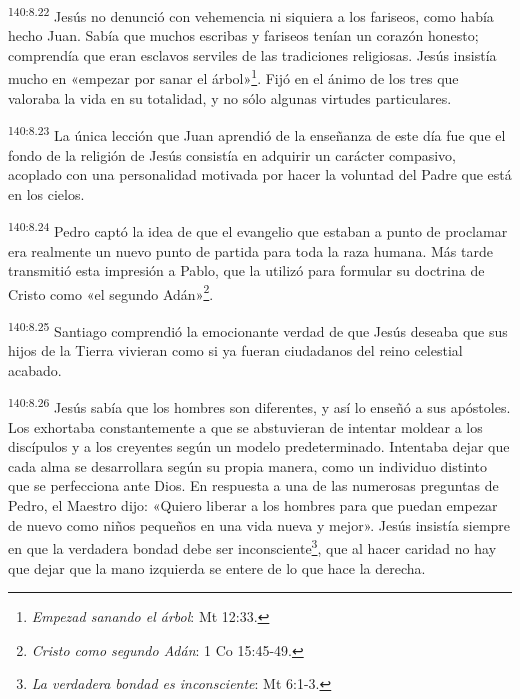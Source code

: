 \par 
\textsuperscript{140:8.22} Jesús no denunció con vehemencia ni siquiera a los fariseos, como había hecho Juan. Sabía que muchos escribas y fariseos tenían un corazón honesto; comprendía que eran esclavos serviles de las tradiciones religiosas. Jesús insistía mucho en «empezar por sanar el árbol»\footnote{\textit{Empezad sanando el árbol}: Mt 12:33.}. Fijó en el ánimo de los tres que valoraba la vida en su totalidad, y no sólo algunas virtudes particulares.

\par 
\textsuperscript{140:8.23} La única lección que Juan aprendió de la enseñanza de este día fue que el fondo de la religión de Jesús consistía en adquirir un carácter compasivo, acoplado con una personalidad motivada por hacer la voluntad del Padre que está en los cielos.

\par 
\textsuperscript{140:8.24} Pedro captó la idea de que el evangelio que estaban a punto de proclamar era realmente un nuevo punto de partida para toda la raza humana. Más tarde transmitió esta impresión a Pablo, que la utilizó para formular su doctrina de Cristo como «el segundo Adán»\footnote{\textit{Cristo como segundo Adán}: 1 Co 15:45-49.}.

\par 
\textsuperscript{140:8.25} Santiago comprendió la emocionante verdad de que Jesús deseaba que sus hijos de la Tierra vivieran como si ya fueran ciudadanos del reino celestial acabado.

\par 
\textsuperscript{140:8.26} Jesús sabía que los hombres son diferentes, y así lo enseñó a sus apóstoles. Los exhortaba constantemente a que se abstuvieran de intentar moldear a los discípulos y a los creyentes según un modelo predeterminado. Intentaba dejar que cada alma se desarrollara según su propia manera, como un individuo distinto que se perfecciona ante Dios. En respuesta a una de las numerosas preguntas de Pedro, el Maestro dijo: «Quiero liberar a los hombres para que puedan empezar de nuevo como niños pequeños en una vida nueva y mejor». Jesús insistía siempre en que la verdadera bondad debe ser inconsciente\footnote{\textit{La verdadera bondad es inconsciente}: Mt 6:1-3.}, que al hacer caridad no hay que dejar que la mano izquierda se entere de lo que hace la derecha.

